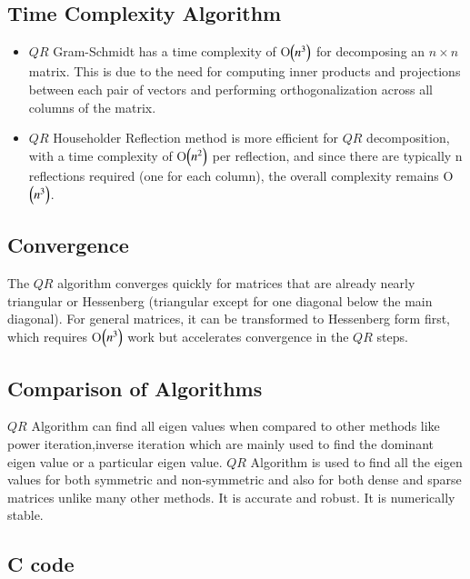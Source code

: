 \documentclass[journal]{IEEEtran}
\begin{document}
\subsection{Time Complexity Algorithm}
\begin{itemize}
    \item $QR$ Gram-Schmidt has a time complexity of O$\left(n^3\right)$ for decomposing an $n \times n$ matrix. This is due to the need for computing inner products and projections between each pair of vectors and performing orthogonalization across all columns of the matrix.  
    \item $QR$ Householder Reflection  method is more efficient for $QR$ decomposition, with a time complexity of O$\left(n^2\right)$ per reflection, and since there are typically n reflections required (one for each column), the overall complexity remains O$\left(n^3\right)$.
\end{itemize}
\subsection{Convergence}
The $QR$ algorithm converges quickly for matrices that are already nearly triangular or Hessenberg (triangular except for one diagonal below the main diagonal). For general matrices, it can be transformed to Hessenberg form first, which requires O$\left(n^3\right)$ work but accelerates convergence in the $QR$ steps.
\subsection{Comparison of Algorithms}
$QR$ Algorithm can find all eigen values when compared to other methods like power iteration,inverse iteration which are mainly used to find the dominant eigen value or a particular eigen value. $QR$ Algorithm is used to find all the eigen values for both symmetric and non-symmetric and also for both dense and sparse matrices unlike many other methods. It is accurate and robust. It is numerically stable.
\subsection{C code}

\end{document}
